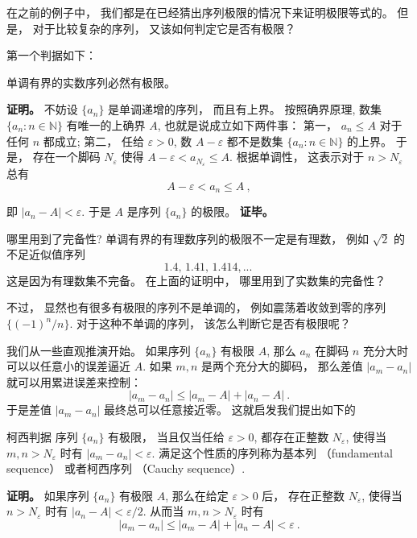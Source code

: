 

在之前的例子中， 我们都是在已经猜出序列极限的情况下来证明极限等式的。 但是， 对于比较复杂的序列， 又该如何判定它是否有极限？

第一个判据如下：

\begin{theorem}{}
单调有界的实数序列必然有极限。
\end{theorem}
\textbf{证明。} 不妨设 $\{a_n\}$ 是单调递增的序列， 而且有上界。 按照确界原理, 数集 $\{a_n:n\in\mathbb{N}\}$ 有唯一的上确界 $A$, 也就是说成立如下两件事： 第一， $a_n\leq A$ 对于任何 $n$ 都成立; 第二， 任给 $\varepsilon>0$, 数 $A-\varepsilon$ 都不是数集 $\{a_n:n\in\mathbb{N}\}$ 的上界。 于是， 存在一个脚码 $N_\varepsilon$ 使得 $A-\varepsilon<a_{N_\varepsilon}\leq A$. 根据单调性， 这表示对于 $n>N_\varepsilon$ 总有
\begin{equation}
A-\varepsilon<a_n\leq A~,
\end{equation}




即 $|a_n-A|<\varepsilon$. 于是 $A$ 是序列 $\{a_n\}$ 的极限。 \textbf{证毕。}

\begin{exercise}{哪里用到了完备性?}
单调有界的有理数序列的极限不一定是有理数， 例如 $\sqrt{2}$ 的不足近似值序列
$$
1.4,\,1.41,\,1.414,...~
$$
这是因为有理数集不完备。 在上面的证明中， 哪里用到了实数集的完备性？
\end{exercise}

不过， 显然也有很多有极限的序列不是单调的， 例如震荡着收敛到零的序列 $\{(-1)^n/n\}$. 对于这种不单调的序列， 该怎么判断它是否有极限呢？

我们从一些直观推演开始。 如果序列 $\{a_n\}$ 有极限 $A$, 那么 $a_n$ 在脚码 $n$ 充分大时可以以任意小的误差逼近 $A$. 如果 $m,n$ 是两个充分大的脚码， 那么差值 $|a_m-a_n|$ 就可以用累进误差来控制：
$$
|a_m-a_n|\leq |a_m-A|+|a_n-A|~.
$$
于是差值 $|a_m-a_n|$ 最终总可以任意接近零。 这就启发我们提出如下的

\begin{theorem}{柯西判据}
序列 $\{a_n\}$ 有极限， 当且仅当任给 $\varepsilon>0$, 都存在正整数 $N_\varepsilon$, 使得当 $m,n>N_\varepsilon$ 时有 $|a_m-a_n|<\varepsilon$. 满足这个性质的序列称为基本列 （fundamental sequence） 或者柯西序列 （Cauchy sequence）.
\end{theorem}

\textbf{证明。} 如果序列 $\{a_n\}$ 有极限 $A$, 那么在给定 $\varepsilon>0$ 后， 存在正整数 $N_\varepsilon$, 使得当 $n>N_\varepsilon$ 时有 $|a_n-A|<\varepsilon/2$. 从而当 $m,n>N_\varepsilon$ 时有
$$
|a_m-a_n|\leq|a_m-A|+|a_n-A|<\varepsilon~.
$$

